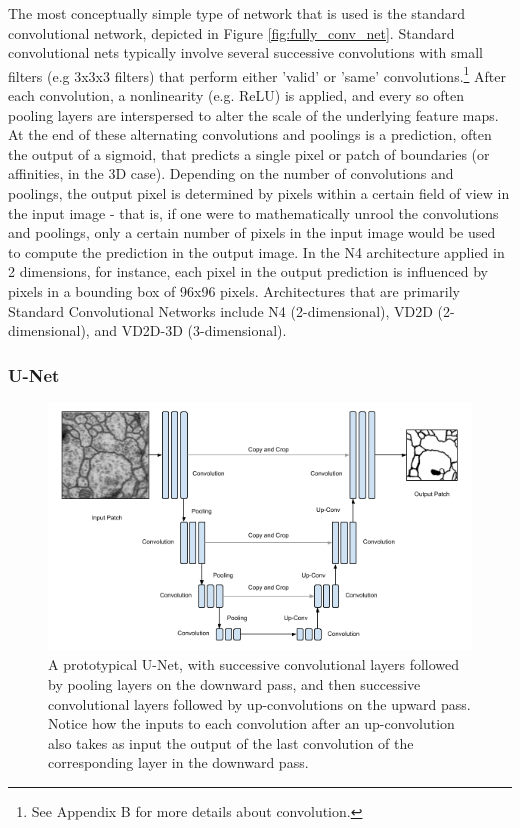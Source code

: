 The most conceptually simple type of network that is used is the standard convolutional network, depicted in Figure \ref{fig:fully_conv_net}. Standard convolutional nets typically involve several successive convolutions with small filters (e.g 3x3x3 filters) that perform either 'valid' or 'same' convolutions.\footnote{See Appendix B for more details about convolution.} After each convolution, a nonlinearity (e.g. ReLU) is applied, and every so often pooling layers are interspersed to alter the scale of the underlying feature maps. At the end of these alternating convolutions and poolings is a prediction, often the output of a sigmoid, that predicts a single pixel or patch of boundaries (or affinities, in the 3D case). Depending on the number of convolutions and poolings, the output pixel is determined by pixels within a certain field of view in the input image - that is, if one were to mathematically unrool the convolutions and poolings, only a certain number of pixels in the input image would be used to compute the prediction in the output image. In the N4 architecture applied in 2 dimensions, for instance, each pixel in the output prediction is influenced by pixels in a bounding box of 96x96 pixels. Architectures that are primarily Standard Convolutional Networks include N4 (2-dimensional), VD2D (2-dimensional), and VD2D-3D (3-dimensional)\cite{Cirean,Lee}.

\subsubsection{U-Net}

\begin{figure}
\centering
\includegraphics[width=\textwidth]{img/U_Net.png}
\caption[A prototypical U-Net]{A prototypical U-Net, with successive convolutional layers followed by pooling layers on the downward pass, and then successive convolutional layers followed by up-convolutions on the upward pass. Notice how the inputs to each convolution after an up-convolution also takes as input the output of the last convolution of the corresponding layer in the downward pass.}
\label{fig:u_net}
\end{figure}

